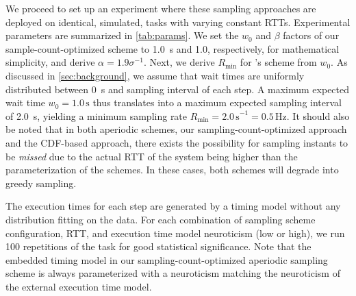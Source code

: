 We proceed to set up an experiment where these sampling approaches are deployed on identical, simulated, tasks with varying constant \glspl{RTT}.
Experimental parameters are summarized in \cref{tab:params}.
We set the \( w_0 \) and \( \beta \) factors of our sample-count-optimized scheme to \SI{1.0}{\second} and \num{1.0}, respectively, for mathematical simplicity, and derive \( \alpha = 1.9 \sigma^{-1} \).
Next, we derive \( R_\text{min} \) for \textcite{wang2019towards}'s scheme from \( w_0 \).
As discussed in \cref{sec:background}, we assume that wait times are uniformly distributed between \SI{0}{\second} and sampling interval of each step.
A maximum expected wait time \( w_0 = 1.0\,\si{\second} \) thus translates into a maximum expected sampling interval of \SI{2.0}{\second}, yielding a minimum sampling rate \( R_\text{min} = {2.0\,\si{\second}}^{-1} = 0.5\,\si{\hertz} \).
It should also be noted that in both aperiodic schemes, our sampling-count-optimized approach and the \gls{CDF}-based approach, there exists the possibility for sampling instants to be \emph{missed} due to the actual \gls{RTT} of the system being higher than the parameterization of the schemes.
In these cases, both schemes will degrade into greedy sampling.

The execution times for each step are generated by a timing model without any distribution fitting on the data.
For each combination of sampling scheme configuration, \gls{RTT}, and execution time model neuroticism (low or high), we run \num{100} repetitions of the task for good statistical significance.
Note that the embedded timing model in our sampling-count-optimized aperiodic sampling scheme is always parameterized with a neuroticism matching the neuroticism of the external execution time model.


